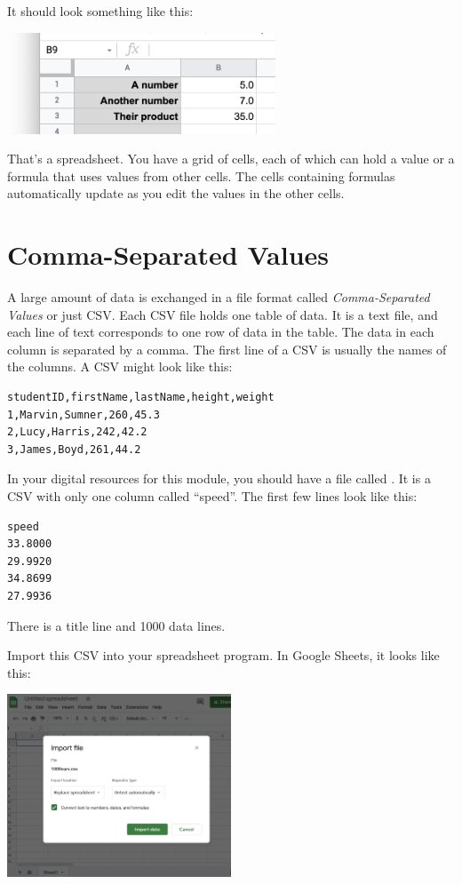 It should look something like this:

\includegraphics[width=0.6\textwidth]{FirstFormatting.png}

That's a spreadsheet. You have a grid of cells, each of which can hold a
value or a formula that uses values from other cells. The cells containing
formulas automatically update as you edit the values in the other
cells.

\section{Comma-Separated Values}

A large amount of data is exchanged in a file format called
\textit{Comma-Separated Values} or just CSV. Each CSV file holds one
table of data. It is a text file, and each line of text corresponds to
one row of data in the table. The data in each column is separated by
a comma. The first line of a CSV is usually the names of the
columns. A CSV might look like this:

\begin{Verbatim}
studentID,firstName,lastName,height,weight
1,Marvin,Sumner,260,45.3
2,Lucy,Harris,242,42.2
3,James,Boyd,261,44.2
\end{Verbatim}

In your digital resources for this module, you should have a file
called . It is a CSV with only one column called
``speed''. The first few lines look like this:

\begin{Verbatim}
speed
33.8000
29.9920
34.8699
27.9936
\end{Verbatim}

There is a title line and 1000 data lines.

Import this CSV into your spreadsheet program. In Google Sheets, it looks like this:

\includegraphics[width=0.5\textwidth]{ImportingCSV.png}

